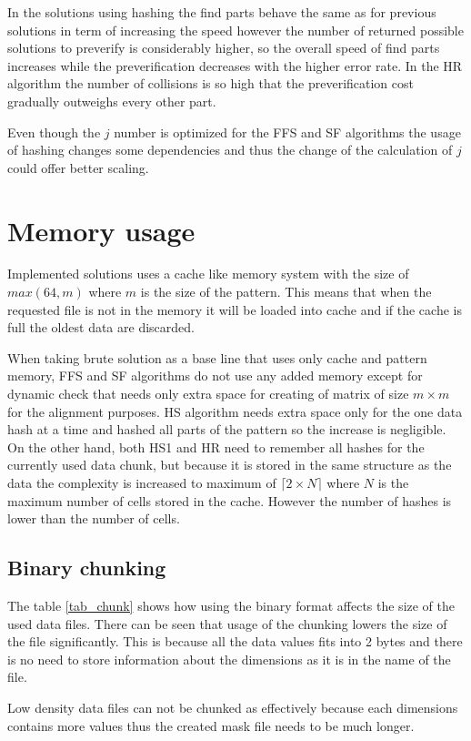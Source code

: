 In the solutions using hashing the find parts behave the same as for previous solutions in term of increasing the speed however the number of returned possible solutions to preverify is considerably higher, so the overall speed of find parts increases while the preverification decreases with the higher error rate. In the HR algorithm the number of collisions is so high that the preverification cost gradually outweighs every other part.

Even though the $j$ number is optimized for the FFS and SF algorithms the usage of hashing changes some dependencies and thus the change of the calculation of $j$ could offer better scaling.

\section{Memory usage}
Implemented solutions uses a cache like memory system with the size of $max(64, m)$ where $m$ is the size of the pattern. This means that when the requested file is not in the memory it will be loaded into cache and if the cache is full the oldest data are discarded. 

When taking brute solution as a base line that uses only cache and pattern memory, FFS and SF algorithms do not use any added memory except for dynamic check that needs only extra space for creating of matrix of size $m\times m$ for the alignment purposes. HS algorithm needs extra space only for the one data hash at a time and hashed all parts of the pattern so the increase is negligible. On the other hand, both HS1 and HR need to remember all hashes for the currently used data chunk, but because it is stored in the same structure as the data the complexity is increased to maximum of $\lceil 2\times N\rceil$ where $N$ is the maximum number of cells stored in the cache. However the number of hashes is lower than the number of cells.

\subsection{Binary chunking}
The table \ref{tab_chunk} shows how using the binary format affects the size of the used data files. There can be seen that usage of the chunking lowers the size of the file significantly. This is because all the data values fits into 2 bytes and there is no need to store information about the dimensions as it is in the name of the file. 

Low density data files can not be chunked as effectively because each dimensions contains more values thus the created mask file needs to be much longer.

